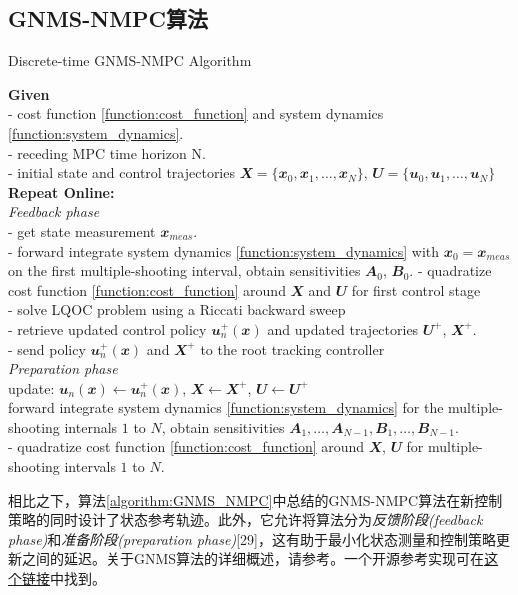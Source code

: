 \subsection[GNMS-NMPC算法]{GNMS-NMPC算法}

\begin{algorithm}
    \caption[short]{Discrete-time GNMS-NMPC Algorithm}
    \label{algorithm:GNMS_NMPC}
    \textbf{Given}\\
    - cost function \eqref{function:cost_function} and system dynamics \eqref{function:system_dynamics}.\\
    - receding MPC time horizon N.\\
    - initial state and control trajectories $\mathbfit{X}=\{\mathbfit{x}_0, \mathbfit{x}_1, \dots, \mathbfit{x}_N\}$, $\mathbfit{U}=\{\mathbfit{u}_0, \mathbfit{u}_1, \dots, \mathbfit{u}_N\}$\\
    \textbf{Repeat Online:}\\
    \textit{Feedback phase}\\
    - get state measurement $\mathbfit{x}_{meas}$.\\
    - forward integrate system dynamics \eqref{function:system_dynamics} with $\mathbfit{x}_0=\mathbfit{x}_{meas}$ on the first multiple-shooting interval, obtain sensitivities $\mathbfit{A}_0$, $\mathbfit{B}_0$.
    - quadratize cost function \eqref{function:cost_function} around $\mathbfit{X}$ and $\mathbfit{U}$ for first control stage\\
    - solve LQOC problem using a Riccati backward sweep\\
    - retrieve updated control policy $\mathbfit{u}_n^+(\mathbfit{x})$ and updated trajectories $\mathbfit{U}^+$, $\mathbfit{X}^+$.\\
    - send policy $\mathbfit{u}_n^+(\mathbfit{x})$ and $\mathbfit{X}^+$ to the root tracking controller\\
    \textit{Preparation phase}\\
    update: $\mathbfit{u}_n(\mathbfit{x})\leftarrow\mathbfit{u}_n^+(\mathbfit{x})$, $\mathbfit{X}\leftarrow\mathbfit{X}^+$, $\mathbfit{U}\leftarrow\mathbfit{U}^+$\\
    forward integrate system dynamics \eqref{function:system_dynamics} for the multiple-shooting internals $1$ to $N$, obtain sensitivities $\mathbfit{A}_1, \dots, \mathbfit{A}_{N-1}, \mathbfit{B}_1, \dots, \mathbfit{B}_{N-1}$.\\
    - quadratize cost function \eqref{function:cost_function} around $\mathbfit{X}$, $\mathbfit{U}$ for multiple-shooting intervals $1$ to $N$. 
\end{algorithm}

相比之下，算法\ref{algorithm:GNMS_NMPC}中总结的GNMS-NMPC算法在新控制策略的同时设计了状态参考轨迹。此外，它允许将算法分为\emph{反馈阶段(feedback phase)}和\emph{准备阶段(preparation phase)}[29]，这有助于最小化状态测量和控制策略更新之间的延迟。关于GNMS算法的详细概述，请参考\cite[p]{Giftthaler_Neunert_Stäuble_Buchli_Diehl_2017}。一个开源参考实现可在\href{https://adrlab.bitbucket.io/ct}{这个链接}中找到。


